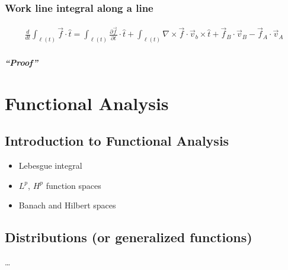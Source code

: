 \documentclass[letterpaper,10pt,english]{jupyterBook}
\begin{document}
\section{Work line integral along a line}
\label{\detokenize{ch/tensor-algebra-calculus/time-derivative-of-integrals:work-line-integral-along-a-line}}\label{\detokenize{ch/tensor-algebra-calculus/time-derivative-of-integrals:tensor-calculus-time-derivative-of-integrals-work}}\begin{equation*}
\begin{split}\frac{d}{dt} \int_{\ell(t)} \vec{f} \cdot \hat{t} =  \int_{\ell(t)} \frac{\partial \vec{f}}{\partial t} \cdot \hat{t} + \int_{\ell(t)} \nabla \times \vec{f} \cdot \vec{v}_b \times \hat{t} + \vec{f}_B \cdot \vec{v}_B - \vec{f}_A \cdot \vec{v}_A \end{split}
\end{equation*}\subsubsection*{“Proof”}

\sphinxstepscope


\part{Functional Analysis}

\sphinxstepscope


\chapter{Introduction to Functional Analysis}
\label{\detokenize{ch/functional-analysis/intro:introduction-to-functional-analysis}}\label{\detokenize{ch/functional-analysis/intro:functional-analysis}}\label{\detokenize{ch/functional-analysis/intro::doc}}\begin{itemize}
\item {} 
\sphinxAtStartPar
Lebesgue integral

\item {} 
\sphinxAtStartPar
\(L^p\), \(H^p\) function spaces

\item {} 
\sphinxAtStartPar
Banach and Hilbert spaces

\end{itemize}

\sphinxstepscope


\chapter{Distributions (or generalized functions)}
\label{\detokenize{ch/functional-analysis/dirac-delta:distributions-or-generalized-functions}}\label{\detokenize{ch/functional-analysis/dirac-delta:functional-analysis-distributions}}\label{\detokenize{ch/functional-analysis/dirac-delta::doc}}
\sphinxAtStartPar
…
\end{document}
